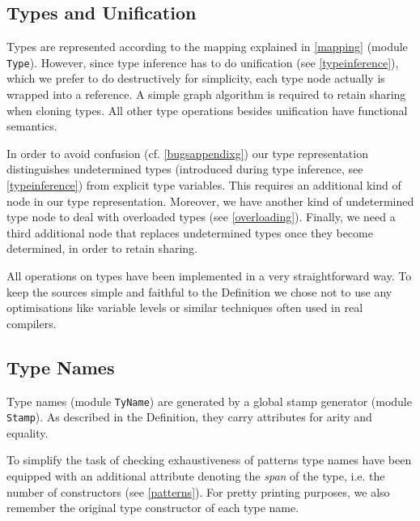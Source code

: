\documentclass[twoside,titlepage]{article}
\newcommand{\void}[1]{}
\begin{document}
\subsection{Types and Unification}
\label{types}

Types are represented according to the mapping explained in \ref{mapping} (module {\tt Type}). However, since type inference has to do unification (see \ref{typeinference}), which we prefer to do destructively for simplicity, each type node actually is wrapped into a reference. A simple graph algorithm is required to retain sharing when cloning types. All other type operations besides unification have functional semantics.

In order to avoid confusion (cf. \ref{bugsappendixg}) our type representation distinguishes undetermined types (introduced during type inference, see \ref{typeinference}) from explicit type variables. This requires an additional kind of node in our type representation. Moreover, we have another kind of undetermined type node to deal with overloaded types (see \ref{overloading}). Finally, we need a third additional node that replaces undetermined types once they become determined, in order to retain sharing.

All operations on types have been implemented in a very straightforward way. To keep the sources simple and faithful to the Definition we chose not to use any optimisations like variable levels or similar techniques often used in real compilers.


\subsection{Type Names}
\label{tynames}

Type names (module {\tt TyName}) are generated by a global stamp generator (module {\tt Stamp}). As described in the Definition, they carry attributes for arity and equality.

\void{
The equality attribute of type names is used in the Definition to determine whether a type admits equality. Those rules treat {\tt ref} in a special way. To generalise the treatment of {\tt ref} and allow for similar types like {\tt array} (which strictly speaking could not be added to SML without modifying the Definition), equality has not been implemented as a boolean attribute but via a tailor-made datatype allowing a third value of `special', {\tt ref}-like equality that is independent of particular argument types.
}

To simplify the task of checking exhaustiveness of patterns type names have been equipped with an additional attribute denoting the {\em span} of the type, i.e. the number of constructors (see \ref{patterns}). For pretty printing purposes, we also remember the original type constructor of each type name.
\end{document}

